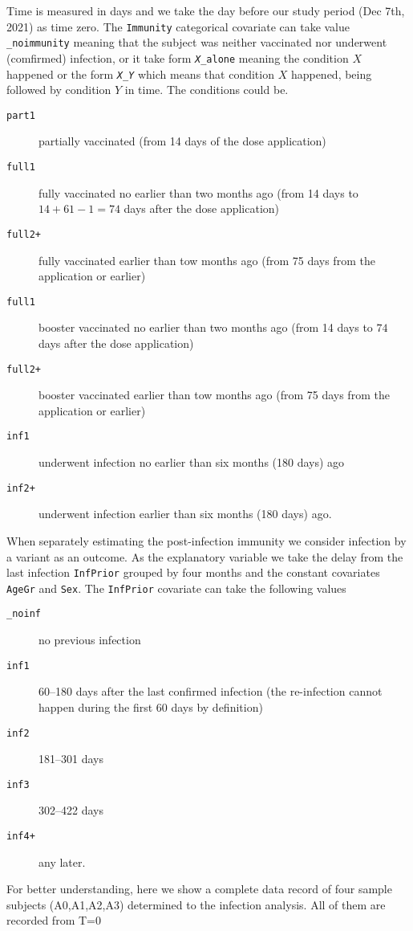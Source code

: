 \documentclass[preprint,12pt,authoryear]{elsarticle}
\begin{document}
Time is measured in days and we take the day before our study period (Dec 7th, 2021) as time zero. The {\tt Immunity} categorical covariate can take value {{\tt \_noimmunity}} meaning that the subject was neither vaccinated nor underwent (comfirmed) infection, or it take form {\tt {\em X}\_alone} meaning the condition $X$ happened or the form {\tt {\em X}\_{\em Y}} which means that condition $X$ happened, being followed by condition $Y$ in time. The conditions could be. 
\begin{description}
\item[{\tt part1}] partially vaccinated (from 14 days of the dose application)
\item[{\tt full1}] fully vaccinated no earlier than two months ago (from 14 days to $14+61-1=74$ days after the dose application)
\item[{\tt full2+}] fully vaccinated earlier than tow months ago (from 75 days from the application or earlier)
\item[{\tt full1}] booster vaccinated no earlier than two months ago (from 14 days to $74$ days after the dose application)
\item[{\tt full2+}] booster vaccinated earlier than tow months ago (from 75 days from the application or earlier)
\item[{\tt inf1}] underwent infection no earlier than six months (180 days) ago 
\item[{\tt inf2+}] underwent infection earlier than six months (180 days) ago. \end{description}

When separately estimating the post-infection immunity we consider infection by a variant as an outcome. As the explanatory variable we take the delay from the last infection {\tt InfPrior} grouped by four months and the constant covariates {\tt AgeGr} and {\tt Sex}. The {\tt InfPrior} covariate can take the following values 
\begin{description}
\item[{\tt \_noinf}] no previous infection
\item[{\tt inf1}] 60--180 days after the last confirmed infection (the re-infection cannot happen during the first 60 days by definition)
\item[{\tt inf2}] 181--301 days 
\item[{\tt inf3}] 302--422 days 
\item[{\tt inf4+}] any later.
\end{description}


For better understanding, here we show a complete data record of four sample subjects (A0,A1,A2,A3) determined to the infection analysis. All of them are recorded from T=0 
\end{document}
